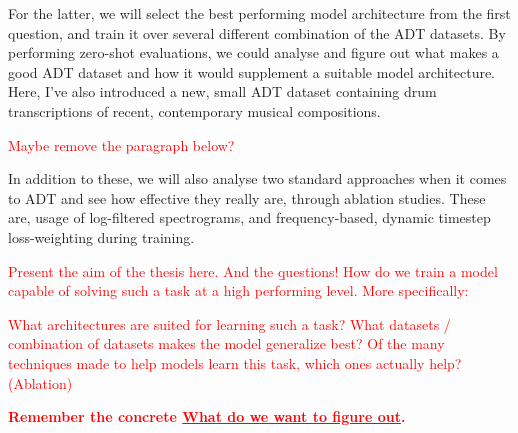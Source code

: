 For the latter, we will select the best performing model architecture from the first question, and train it over several different combination of the \gls{ADT} datasets. By performing zero-shot evaluations, we could analyse and figure out what makes a good \gls{ADT} dataset and how it would supplement a suitable model architecture. Here, I've also introduced a new, small \gls{ADT} dataset containing drum transcriptions of recent, contemporary musical compositions.

\textcolor{red}{Maybe remove the paragraph below?}

In addition to these, we will also analyse two standard approaches when it comes to \gls{ADT} and see how effective they really are, through ablation studies. These are, usage of log-filtered spectrograms, and frequency-based, dynamic timestep loss-weighting during training. 

\textcolor{red}{
    Present the aim of the thesis here. And the \b{questions!}
How do we train a model capable of solving such a task at a high performing level. More specifically:
}


\textcolor{red}{
What architectures are suited for learning such a task?
What datasets / combination of datasets makes the model generalize best?
Of the many techniques made to help models learn this task, which ones actually help? (Ablation)
}

\textcolor{red}{\textbf{Remember the concrete \underline{What do we want to figure out}.}}